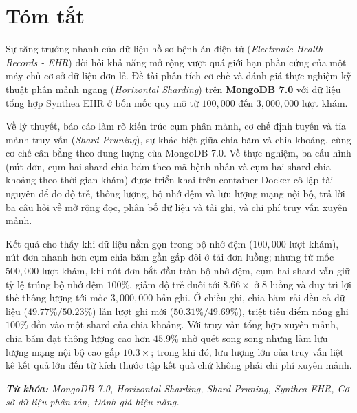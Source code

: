 \clearpage
{}
{}
\chapter*{Tóm tắt}

\noindent
Sự tăng trưởng nhanh của dữ liệu hồ sơ bệnh án điện tử (\textit{Electronic Health Records - EHR}) đòi hỏi khả năng mở rộng vượt quá giới hạn phần cứng của một máy chủ cơ sở dữ liệu đơn lẻ. Đề tài phân tích cơ chế và đánh giá thực nghiệm kỹ thuật phân mảnh ngang (\textit{Horizontal Sharding}) trên \textbf{MongoDB 7.0} với dữ liệu tổng hợp Synthea EHR ở bốn mốc quy mô từ $100{,}000$ đến $3{,}000{,}000$ lượt khám.

Về lý thuyết, báo cáo làm rõ kiến trúc cụm phân mảnh, cơ chế định tuyến và tỉa mảnh truy vấn (\textit{Shard Pruning}), sự khác biệt giữa chia băm và chia khoảng, cùng cơ chế cân bằng theo dung lượng của MongoDB 7.0. Về thực nghiệm, ba cấu hình (nút đơn, cụm hai shard chia băm theo mã bệnh nhân và cụm hai shard chia khoảng theo thời gian khám) được triển khai trên container Docker cô lập tài nguyên để đo độ trễ, thông lượng, bộ nhớ đệm và lưu lượng mạng nội bộ, trả lời ba câu hỏi về mở rộng đọc, phân bố dữ liệu và tải ghi, và chi phí truy vấn xuyên mảnh.

Kết quả cho thấy khi dữ liệu nằm gọn trong bộ nhớ đệm ($100{,}000$ lượt khám), nút đơn nhanh hơn cụm chia băm gần gấp đôi ở tải đơn luồng; nhưng từ mốc $500{,}000$ lượt khám, khi nút đơn bắt đầu tràn bộ nhớ đệm, cụm hai shard vẫn giữ tỷ lệ trúng bộ nhớ đệm $100\%$, giảm độ trễ đuôi tới $8.66\times$ ở 8 luồng và duy trì lợi thế thông lượng tới mốc $3{,}000{,}000$ bản ghi. Ở chiều ghi, chia băm rải đều cả dữ liệu ($49.77\%/50.23\%$) lẫn lượt ghi mới ($50.31\%/49.69\%$), triệt tiêu điểm nóng ghi $100\%$ dồn vào một shard của chia khoảng. Với truy vấn tổng hợp xuyên mảnh, chia băm đạt thông lượng cao hơn $45.9\%$ nhờ quét song song nhưng làm lưu lượng mạng nội bộ cao gấp $10.3\times$; trong khi đó, lưu lượng lớn của truy vấn liệt kê kết quả lớn đến từ kích thước tập kết quả chứ không phải chi phí xuyên mảnh.

\vspace{0.5cm}
\noindent\textit{\textbf{Từ khóa:}} \textit{MongoDB 7.0, Horizontal Sharding, Shard Pruning, Synthea EHR, Cơ sở dữ liệu phân tán, Đánh giá hiệu năng.}
